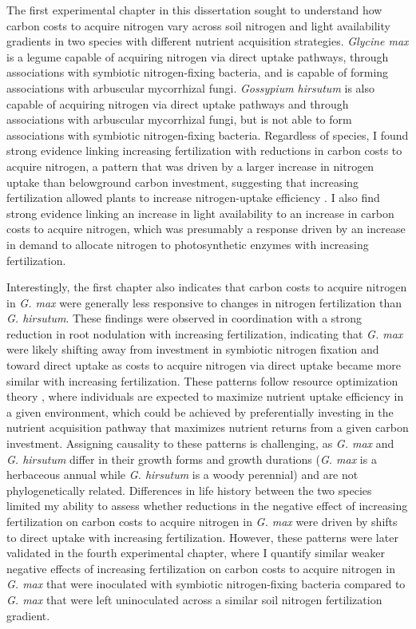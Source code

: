 \noindent The first experimental chapter in this dissertation sought to understand how carbon costs to acquire nitrogen vary across soil nitrogen and light availability gradients in two species with different nutrient acquisition strategies. \textit{Glycine max} is a legume capable of acquiring nitrogen via direct uptake pathways, through associations with symbiotic nitrogen-fixing bacteria, and is capable of forming associations with arbuscular mycorrhizal fungi. \textit{Gossypium hirsutum} is also capable of acquiring nitrogen via direct uptake pathways and through associations with arbuscular mycorrhizal fungi, but is not able to form associations with symbiotic nitrogen-fixing bacteria. Regardless of species, I found strong evidence linking increasing fertilization with reductions in carbon costs to acquire nitrogen, a pattern that was driven by a larger increase in nitrogen uptake than belowground carbon investment, suggesting that increasing fertilization allowed plants to increase nitrogen-uptake efficiency . I also find strong evidence linking an increase in light availability to an increase in carbon costs to acquire nitrogen, which was presumably a response driven by an increase in demand to allocate nitrogen to photosynthetic enzymes with increasing fertilization.

Interestingly, the first chapter also indicates that carbon costs to acquire nitrogen in \textit{G. max} were generally less responsive to changes in nitrogen fertilization than \textit{G. hirsutum}. These findings were observed in coordination with a strong reduction in root nodulation with increasing fertilization, indicating that \textit{G. max} were likely shifting away from investment in symbiotic nitrogen fixation and toward direct uptake as costs to acquire nitrogen via direct uptake became more similar with increasing fertilization. These patterns follow resource optimization theory , where individuals are expected to maximize nutrient uptake efficiency in a given environment, which could be achieved by preferentially investing in the nutrient acquisition pathway that maximizes nutrient returns from a given carbon investment. Assigning causality to these patterns is challenging, as \textit{G. max} and \textit{G. hirsutum} differ in their growth forms and growth durations (\textit{G. max} is a herbaceous annual while \textit{G. hirsutum} is a woody perennial) and are not phylogenetically related. Differences in life history between the two species limited my ability to assess whether reductions in the negative effect of increasing fertilization on carbon costs to acquire nitrogen in \textit{G. max} were driven by shifts to direct uptake with increasing fertilization. However, these patterns were later validated in the fourth experimental chapter, where I quantify similar weaker negative effects of increasing fertilization on carbon costs to acquire nitrogen in \textit{G. max} that were inoculated with symbiotic nitrogen-fixing bacteria compared to \textit{G. max} that were left uninoculated across a similar soil nitrogen fertilization gradient.


